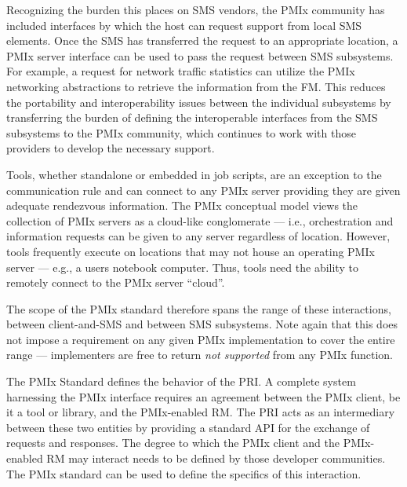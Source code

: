 Recognizing the burden this places on SMS vendors, the PMIx community has included interfaces by
which the host can request support from local SMS elements. Once the SMS has transferred the request to
an appropriate location, a PMIx server interface can be used to pass the request between SMS subsystems.
For example, a request for network traffic statistics can utilize the
PMIx networking abstractions to retrieve the information from the \ac{FM}. This reduces the portability and
interoperability issues between the individual subsystems by transferring the burden of defining the
interoperable interfaces from the SMS subsystems to the PMIx community, which continues
to work with those providers to develop the necessary support.


Tools, whether standalone or embedded in job scripts, are an exception to the communication rule and can connect to
any PMIx server providing they are given adequate rendezvous information. The PMIx conceptual model views the
collection of PMIx servers as a cloud-like conglomerate --- i.e., orchestration and information requests can be
given to any server regardless of location. However, tools frequently execute on locations that may not house an
operating PMIx server --- e.g., a users notebook computer. Thus, tools need the ability to remotely connect to
the PMIx server ``cloud''.

The scope of the PMIx standard therefore spans the range of these interactions, between client-and-SMS and between SMS
subsystems. Note again that this does not impose a requirement on any given PMIx implementation to cover the entire
range --- implementers are free to return \textit{not supported} from any PMIx function.

The \ac{PMIx} Standard defines the behavior of the \acf{PRI}.
A complete system harnessing the \ac{PMIx} interface requires an agreement between the \ac{PMIx} client, be it a tool or library, and the \ac{PMIx}-enabled \ac{RM}.
The \ac{PRI} acts as an intermediary between these two entities by providing a standard API for the exchange of requests and responses.
The degree to which the \ac{PMIx} client and the \ac{PMIx}-enabled \ac{RM} may interact needs to be defined by those developer communities.
The \ac{PMIx} standard can be used to define the specifics of this interaction.

